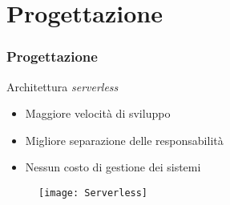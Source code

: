 
\section{Progettazione}
\begin{frame}

  \frametitle{Progettazione}

  Architettura \textit{serverless}
  \begin{itemize}
  \item Maggiore velocit\`a di sviluppo
  \item Migliore separazione delle responsabilit\`a
  \item Nessun costo di gestione dei sistemi
  \end{itemize}

  \begin{figure}[H]
    \centering
    \texttt{[image: Serverless]}
  \end{figure}
\end{frame}
